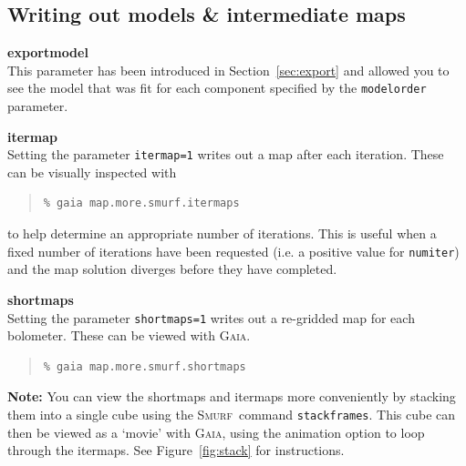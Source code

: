 \documentclass[twoside,11pt]{article}
\newcommand{\htmlref}[2]{#1}
\newcommand{\latexhtml}[2]{#1}
\newcommand{\xref}[3]{#1}
\newcommand{\xlabel}[1]{}
\renewcommand{\_}{\texttt{\symbol{95}}}
\newenvironment{myquote}{\begin{quote}\begin{small}}{\end{small}\end{quote}}
\newcommand{\gaia}{\xref{\textsc{Gaia}}{sun214}{}}
\newcommand{\smurf}{\xref{\textsc{Smurf}}{sun258}{}}
\newcommand{\cref}[3]{\latexhtml{#1~\ref{#2}}{\htmlref{#3}{#2}}}
\begin{document}
\subsection{\xlabel{inter}Writing out models \& intermediate maps}
\textbf{exportmodel}\\
This parameter has been introduced in
\cref{Section}{sec:export}{Exporting individual models} and
allowed you to see the model that was fit for each component
specified by the \texttt{modelorder} parameter.

{\bf itermap}\\
Setting the parameter \texttt{itermap=1} writes out a map after each
iteration. These can be visually inspected with

\begin{myquote}
\begin{verbatim}
% gaia map.more.smurf.itermaps
\end{verbatim}
\end{myquote}
to help determine an appropriate number of iterations. This is useful
when a fixed number of iterations have been requested (i.e. a positive
value for \texttt{numiter}) and the map solution diverges before
they have completed.

\textbf{shortmaps}\\
Setting the parameter \texttt{shortmaps=1} writes out a re-gridded map
for each bolometer. These can be viewed with \gaia.

\begin{myquote}
\begin{verbatim}
% gaia map.more.smurf.shortmaps
\end{verbatim}
\end{myquote}

\textbf{Note:} You can view the shortmaps and itermaps more
conveniently by stacking them into a single cube using the \smurf\
command \texttt{stackframes}. This cube can then be viewed as a
`movie' with \gaia, using the animation option to loop through the
itermaps. See \cref{Figure}{fig:stack}{the box below} for instructions.
\end{document}
